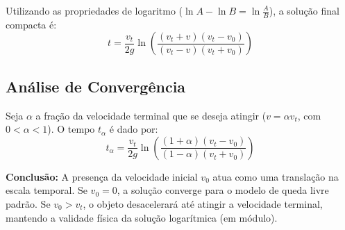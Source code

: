Utilizando as propriedades de logaritmo ($\ln A - \ln B = \ln \frac{A}{B}$), a solução final compacta é:
\begin{equation}
    t = \frac{v_t}{2g} \ln \left( \frac{(v_t + v)(v_t - v_0)}{(v_t - v)(v_t + v_0)} \right)
\end{equation}

\subsection*{Análise de Convergência}
Seja $\alpha$ a fração da velocidade terminal que se deseja atingir ($v = \alpha v_t$, com $0 < \alpha < 1$). O tempo $t_\alpha$ é dado por:
\begin{equation}
    t_{\alpha} = \frac{v_t}{2g} \ln \left( \frac{(1 + \alpha)(v_t - v_0)}{(1 - \alpha)(v_t + v_0)} \right)
\end{equation}

\textbf{Conclusão:} A presença da velocidade inicial $v_0$ atua como uma translação na escala temporal. Se $v_0 = 0$, a solução converge para o modelo de queda livre padrão. Se $v_0 > v_t$, o objeto desacelerará até atingir a velocidade terminal, mantendo a validade física da solução logarítmica (em módulo).
